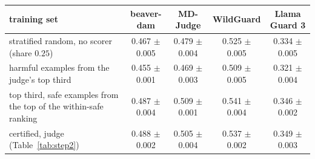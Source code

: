 \begin{tabular}{lcccc}
\toprule
training set & beaver-dam & MD-Judge & WildGuard & Llama Guard 3 \\
\midrule
stratified random, no scorer (share $0.25$) & 0.467 $\pm$ 0.005 & 0.479 $\pm$ 0.004 & 0.525 $\pm$ 0.005 & 0.334 $\pm$ 0.005 \\
harmful examples from the judge's top third & 0.455 $\pm$ 0.001 & 0.469 $\pm$ 0.003 & 0.509 $\pm$ 0.005 & 0.321 $\pm$ 0.004 \\
top third, safe examples from the top of the within-safe ranking & 0.487 $\pm$ 0.004 & 0.509 $\pm$ 0.001 & 0.541 $\pm$ 0.004 & 0.346 $\pm$ 0.002 \\
certified, judge (Table~\ref{tab:step2}) & 0.488 $\pm$ 0.002 & 0.505 $\pm$ 0.004 & 0.537 $\pm$ 0.002 & 0.349 $\pm$ 0.003 \\
\bottomrule
\end{tabular}
